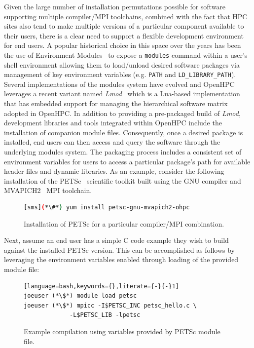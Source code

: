 \documentclass{sig-alternate-05-2015}
\begin{document}
\noindent
Given the large number of installation permutations possible for software
supporting multiple compiler/MPI toolchains, combined with the fact that HPC
sites also tend to make multiple versions of a particular component available
to their users, there is a clear need to support a flexible development environment for end
users. A popular historical choice in this space over the years has been the
use of Environment Modules~\cite{furlani_1996} to expose a \texttt{modules}
command within a user's shell environment allowing them to load/unload desired
software packages via management of key environment variables
(e.g. \texttt{{PATH}} and \texttt{{LD\_LIBRARY\_PATH}}). Several
implementations of the modules system have evolved and OpenHPC leverages a
recent variant named {\em Lmod}~\cite{tacc_sc_best_practices:2011,lmod_url}
which is a Lua-based implementation that has embedded support for managing the
hierarchical software matrix adopted in OpenHPC.  In addition to providing a
pre-packaged build of {\em Lmod}, development libraries and tools integrated
within OpenHPC include the installation of companion module files.
Consequently, once a desired package is installed, end users can then access
and query the software through the underlying modules system. The packaging
process includes a consistent set of environment variables for users to
access a particular package's path for available header files and dynamic
libraries. As an example, consider the following installation of the
PETSc~\cite{PETSc_url} scientific toolkit built using the GNU compiler and
MVAPICH2~\cite{mvapich2} MPI toolchain.

\begin{figure}[h]
\begin{lstlisting}[language=bash,keywords={}]
[sms](*\#*) yum install petsc-gnu-mvapich2-ohpc
\end{lstlisting}
\vspace*{-0.3cm}
  \caption{Installation of PETSc for a particular compiler/MPI combination.}
    \label{fig:petscinstall}
\end{figure}

\noindent
Next, assume an end user has a simple C code example they wish to build against
the installed PETSc version. This can be accomplished as follows by leveraging
the environment variables enabled through loading of the provided module file:

\begin{figure}[h]
\begin{lstlisting}[language=bash,keywords={},literate={-}{-}1]
joeuser (*\$*) module load petsc
joeuser (*\$*) mpicc -I$PETSC_INC petsc_hello.c \
             -L$PETSC_LIB -lpetsc
\end{lstlisting}
\vspace*{-0.3cm}
  \caption{Example compilation using variables provided by PETSc module file.}
    \label{fig:petsccompile}
\end{figure}
\end{document}
